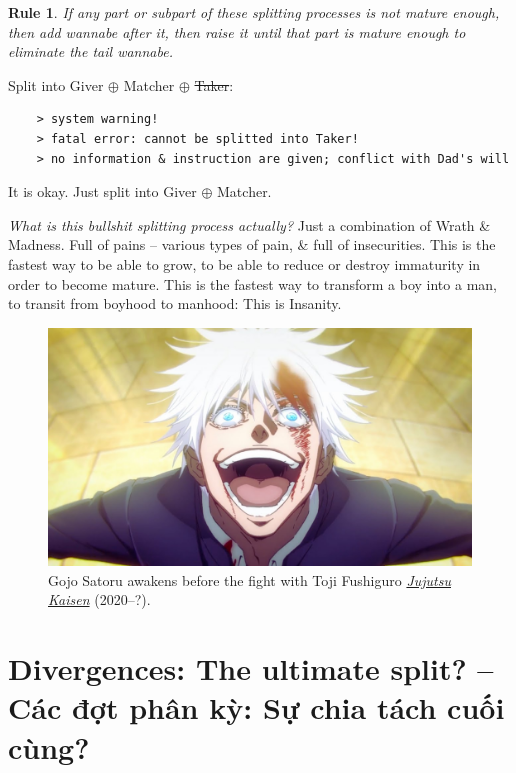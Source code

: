 \documentclass[12pt,oneside]{book}
\newtheorem{Rule}{Rule}
\begin{document}
\begin{Rule}
	If any part or subpart of these splitting processes is not mature enough, then add {\it wannabe} after it, then raise it until that part is mature enough to eliminate the tail {\it wannabe}.
\end{Rule}
Split into Giver $\oplus$ Matcher $\oplus$ \st{Taker}:
\begin{verbatim}
	> system warning!
	> fatal error: cannot be splitted into Taker!
	> no information & instruction are given; conflict with Dad's will
\end{verbatim}
It is okay. Just split into Giver $\oplus$ Matcher.

{\it What is this bullshit splitting process actually?} Just a combination of {\sf Wrath} \& {\sf Madness}. Full of pains -- various types of pain, \& full of insecurities. This is the fastest way to be able to grow, to be able to reduce or destroy immaturity in order to become mature. This is the fastest way to transform a boy into a man, to transit from boyhood to manhood: This is {\sc Insanity}.

\begin{figure}[H]
	\centering
	\includegraphics[width = 12cm]{Gojo_awaken}
	\caption{{\sf Gojo Satoru} awakens before the fight with {\sf Toji Fushiguro} \href{https://www.imdb.com/title/tt12343534/}{\it Jujutsu Kaisen} (2020--?).}
\end{figure}

\section{Divergences: The ultimate split? -- Các đợt phân kỳ: Sự chia tách cuối cùng?}
\begin{flushright}
	\musEighth[\href{https://www.youtube.com/watch?v=_4m02-f9aQs}{Hyori Ittai Lamento for Piano} | Hunter $\times$ Hunter]\musEighth
\end{flushright}
\end{document}
